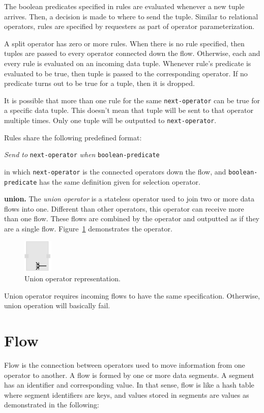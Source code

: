 The boolean predicates specified in rules are evaluated whenever a new tuple 
arrives. Then, a decision is made to where to send the tuple. Similar to relational 
operators, rules are specified by requesters as part of operator 
parameterization.

A split operator has zero or more rules. When there is no rule specified, then 
tuples are passed to every operator connected down the flow. Otherwise, each 
and every rule is evaluated on an incoming data tuple. Whenever rule's predicate 
is evaluated to be true, then tuple is passed to the corresponding operator. If no 
predicate turns out to be true for a tuple, then it is dropped.

It is possible that more than one rule for the same \texttt{next-operator} can be true 
for a specific data tuple. This doesn't mean that tuple will be sent to that operator 
multiple times. Only one tuple will be outputted to \texttt{next-operator}.

Rules share the following predefined format:

\textit{Send to} \texttt{next-operator} \textit{when} \texttt{boolean-predicate}

in which \texttt{next-operator} is the connected operators down the flow, and 
\texttt{boolean-predicate} has the same definition given for selection operator.

\textbf{union.}
The \textit{union operator} is a stateless operator used to join two or more data flows 
into one. Different than other operators, this operator can receive more than one flow. 
These flows are combined by the operator and outputted as if they are a single flow. 
Figure~\ref{fig:union operator} demonstrates the operator.

\begin{figure}[ht]
	\centering
	\includegraphics[height=60px]{figures/UnionOperator.pdf}
	\caption{Union operator representation.}
	\label{fig:union operator}
\end{figure}

Union operator requires incoming flows to have the same specification. Otherwise, 
union operation will basically fail.

\section{Flow}
Flow is the connection between operators used to move information from one operator 
to another. A flow is formed by one or more data segments. A segment has an identifier 
and corresponding value. In that sense, flow is like a hash table where segment identifiers 
are keys, and values stored in segments are values as demonstrated in the following:

